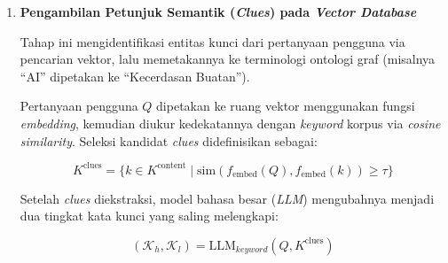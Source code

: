 \begin{enumerate}[label=\textbf{\arabic*.}, leftmargin=*, itemsep=10pt]
          \begin{enumerate}[label=\textbf{\alph*.}, leftmargin=*, itemsep=5pt]

              \item \textbf{Pengambilan Petunjuk Semantik (\textit{Clues}) pada \textit{Vector Database}}

                    \hspace*{0.75cm}Tahap ini mengidentifikasi entitas kunci dari pertanyaan pengguna via pencarian vektor, lalu memetakannya ke terminologi ontologi graf (misalnya ``AI'' dipetakan ke ``Kecerdasan Buatan'').

                    \hspace*{0.75cm}Pertanyaan pengguna $Q$ dipetakan ke ruang vektor menggunakan fungsi \textit{embedding}, kemudian diukur kedekatannya dengan \textit{keyword} korpus via \textit{cosine similarity}. Seleksi kandidat \textit{clues} didefinisikan sebagai:

                    \begin{equation}
                        K^{\text{clues}} = \{k \in K^{\text{content}} \mid \text{sim}(f_{\text{embed}}(Q), f_{\text{embed}}(k)) \geq \tau\}
                    \end{equation}

                    \hspace*{0.75cm}Setelah \textit{clues} diekstraksi, model bahasa besar (\textit{LLM}) mengubahnya menjadi dua tingkat kata kunci yang saling melengkapi:

                    \begin{equation}
                        (\mathcal{K}_h, \mathcal{K}_l) = \text{LLM}_{keyword}(Q, K^{\text{clues}})
                    \end{equation}


\end{enumerate}
\end{enumerate}
